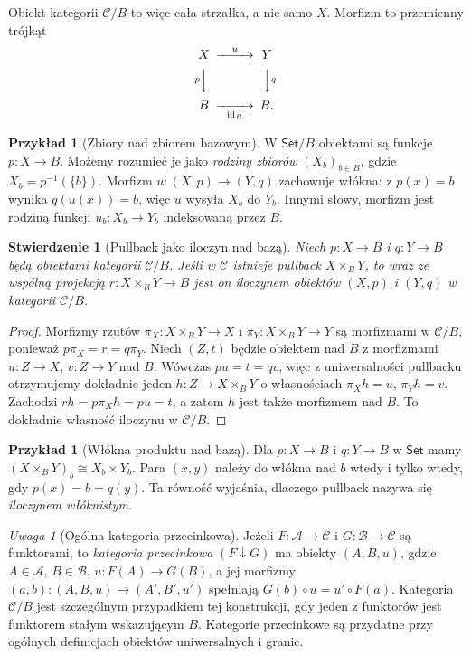 \documentclass[11pt,a4paper]{article}
\numberwithin{equation}{section}
\theoremstyle{plain}
\newtheorem{stwierdzenie}[twierdzenie]{Stwierdzenie}
\theoremstyle{definition}
\newtheorem{przyklad}[twierdzenie]{Przykład}
\theoremstyle{remark}
\newtheorem{uwaga}[twierdzenie]{Uwaga}
\newcommand{\cat}[1]{\mathsf{#1}}
\newcommand{\Set}{\cat{Set}}
\newcommand{\id}{\mathrm{id}}
\begin{document}
Obiekt kategorii $\mathcal C/B$ to więc cała strzałka, a nie samo $X$. Morfizm to przemienny trójkąt
\[
\begin{CD}
X @>{u}>> Y\\
@V{p}VV @VV{q}V\\
B @>>{\id_B}> B.
\end{CD}
\]

\begin{przyklad}[Zbiory nad zbiorem bazowym]
W $\Set/B$ obiektami są funkcje $p:X\to B$. Możemy rozumieć je jako \emph{rodziny zbiorów} $(X_b)_{b\in B}$, gdzie $X_b=p^{-1}(\{b\})$. Morfizm $u:(X,p)\to(Y,q)$ zachowuje włókna: z $p(x)=b$ wynika $q(u(x))=b$, więc $u$ wysyła $X_b$ do $Y_b$. Innymi słowy, morfizm jest rodziną funkcji $u_b:X_b\to Y_b$ indeksowaną przez $B$.
\end{przyklad}

\begin{stwierdzenie}[Pullback jako iloczyn nad bazą]
Niech $p:X\to B$ i $q:Y\to B$ będą obiektami kategorii $\mathcal C/B$. Jeśli w $\mathcal C$ istnieje pullback $X\times_B Y$, to wraz ze wspólną projekcją $r:X\times_B Y\to B$ jest on iloczynem obiektów $(X,p)$ i $(Y,q)$ w kategorii $\mathcal C/B$.
\end{stwierdzenie}
\begin{proof}
Morfizmy rzutów $\pi_X:X\times_B Y\to X$ i $\pi_Y:X\times_B Y\to Y$ są morfizmami w $\mathcal C/B$, ponieważ $p\pi_X=r=q\pi_Y$. Niech $(Z,t)$ będzie obiektem nad $B$ z morfizmami $u:Z\to X$, $v:Z\to Y$ nad $B$. Wówczas $pu=t=qv$, więc z uniwersalności pullbacku otrzymujemy dokładnie jeden $h:Z\to X\times_B Y$ o własnościach $\pi_Xh=u$, $\pi_Yh=v$. Zachodzi $rh=p\pi_Xh=pu=t$, a zatem $h$ jest także morfizmem nad $B$. To dokładnie własność iloczynu w $\mathcal C/B$.
\end{proof}

\begin{przyklad}[Włókna produktu nad bazą]
Dla $p:X\to B$ i $q:Y\to B$ w $\Set$ mamy $(X\times_B Y)_b\cong X_b\times Y_b$. Para $(x,y)$ należy do włókna nad $b$ wtedy i tylko wtedy, gdy $p(x)=b=q(y)$. Ta równość wyjaśnia, dlaczego pullback nazywa się \emph{iloczynem włóknistym}.
\end{przyklad}

\begin{uwaga}[Ogólna kategoria przecinkowa]
Jeżeli $F:\mathcal A\to\mathcal C$ i $G:\mathcal B\to\mathcal C$ są funktorami, to \emph{kategoria przecinkowa} $(F\downarrow G)$ ma obiekty $(A,B,u)$, gdzie $A\in\mathcal A$, $B\in\mathcal B$, $u:F(A)\to G(B)$, a jej morfizmy $(a,b):(A,B,u)\to(A',B',u')$ spełniają $G(b)\circ u=u'\circ F(a)$. Kategoria $\mathcal C/B$ jest szczególnym przypadkiem tej konstrukcji, gdy jeden z funktorów jest funktorem stałym wskazującym $B$. Kategorie przecinkowe są przydatne przy ogólnych definicjach obiektów uniwersalnych i granic.
\end{uwaga}
\end{document}
